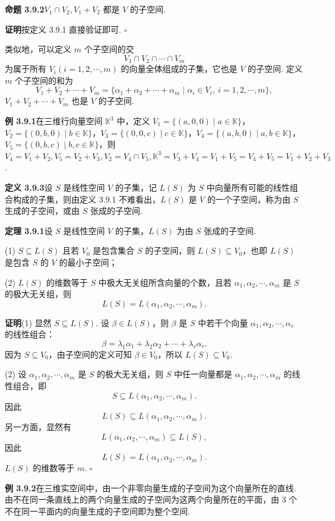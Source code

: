 \documentclass[UTF8,12pt,a4paper,fontset=fandol]{ctexart}
\begin{document}
\noindent\textbf{命题 3.9.2}\quad $V_1\cap V_2,V_1+V_2$ 都是 $V$ 的子空间.

\noindent\textbf{证明}\quad 按定义 3.9.1 直接验证即可. $\square$

类似地，可以定义 $m$ 个子空间的交
\[
V_1\cap V_2\cap\cdots\cap V_m
\]
为属于所有 $V_i(i=1,2,\cdots,m)$ 的向量全体组成的子集，它也是 $V$ 的子空间. 定义 $m$ 个子空间的和为
\[
V_1+V_2+\cdots+V_m=\{\alpha_1+\alpha_2+\cdots+\alpha_m\mid \alpha_i\in V_i,\ i=1,2,\cdots,m\},
\]
$V_1+V_2+\cdots+V_m$ 也是 $V$ 的子空间.

\noindent\textbf{例 3.9.1}\quad 在三维行向量空间 $\mathbb{K}^3$ 中，定义 $V_1=\{(a,0,0)\mid a\in\mathbb{K}\}$，$V_2=\{(0,b,0)\mid b\in\mathbb{K}\}$，$V_3=\{(0,0,c)\mid c\in\mathbb{K}\}$，$V_4=\{(a,b,0)\mid a,b\in\mathbb{K}\}$，$V_5=\{(0,b,c)\mid b,c\in\mathbb{K}\}$，则 $V_4=V_1+V_2,V_5=V_2+V_3,V_2=V_4\cap V_5,\mathbb{K}^3=V_3+V_4=V_1+V_5=V_4+V_5=V_1+V_2+V_3$.

\noindent\textbf{定义 3.9.3}\quad 设 $S$ 是线性空间 $V$ 的子集，记 $L(S)$ 为 $S$ 中向量所有可能的线性组合构成的子集，则由定义 3.9.1 不难看出，$L(S)$ 是 $V$ 的一个子空间，称为由 $S$ 生成的子空间，或由 $S$ 张成的子空间.

\noindent\textbf{定理 3.9.1}\quad 设 $S$ 是线性空间 $V$ 的子集，$L(S)$ 为由 $S$ 张成的子空间.

(1) $S\subseteq L(S)$ 且若 $V_0$ 是包含集合 $S$ 的子空间，则 $L(S)\subseteq V_0$，也即 $L(S)$ 是包含 $S$ 的 $V$ 的最小子空间；

(2) $L(S)$ 的维数等于 $S$ 中极大无关组所含向量的个数，且若 $\alpha_1,\alpha_2,\cdots,\alpha_m$ 是 $S$ 的极大无关组，则
\[
L(S)=L(\alpha_1,\alpha_2,\cdots,\alpha_m).
\]

\noindent\textbf{证明}\quad (1) 显然 $S\subseteq L(S)$. 设 $\beta\in L(S)$，则 $\beta$ 是 $S$ 中若干个向量 $\alpha_1,\alpha_2,\cdots,\alpha_r$ 的线性组合：
\[
\beta=\lambda_1\alpha_1+\lambda_2\alpha_2+\cdots+\lambda_r\alpha_r.
\]
因为 $S\subseteq V_0$，由子空间的定义可知 $\beta\in V_0$，所以 $L(S)\subseteq V_0$.

(2) 设 $\alpha_1,\alpha_2,\cdots,\alpha_m$ 是 $S$ 的极大无关组，则 $S$ 中任一向量都是 $\alpha_1,\alpha_2,\cdots,\alpha_m$ 的线性组合，即
\[
S\subseteq L(\alpha_1,\alpha_2,\cdots,\alpha_m).
\]
因此
\[
L(S)\subseteq L(\alpha_1,\alpha_2,\cdots,\alpha_m).
\]
另一方面，显然有
\[
L(\alpha_1,\alpha_2,\cdots,\alpha_m)\subseteq L(S),
\]
因此
\[
L(S)=L(\alpha_1,\alpha_2,\cdots,\alpha_m).
\]
$L(S)$ 的维数等于 $m$. $\square$

\noindent\textbf{例 3.9.2}\quad 在三维实空间中，由一个非零向量生成的子空间为这个向量所在的直线. 由不在同一条直线上的两个向量生成的子空间为这两个向量所在的平面，由 3 个不在同一平面内的向量生成的子空间即为整个空间.
\end{document}
